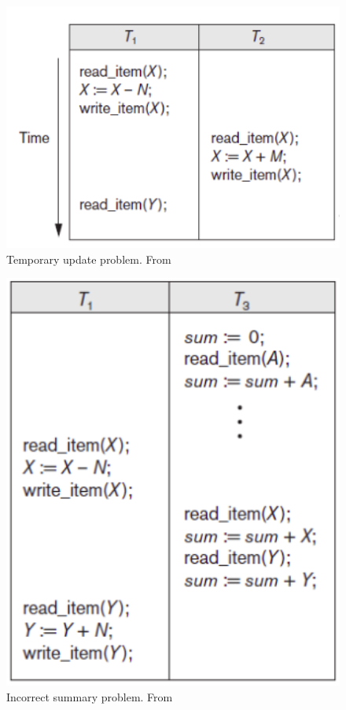 \newpage
\begin{appendices}
\begin{figure}[!h]
    \centering
    \includegraphics[width=12cm]{image/temporary_update_problem.png}
    \caption{Temporary update problem. From \cite{}}
    \label{fig:temporary_update_problem}
\end{figure}
\begin{figure}[!h]
    \centering
    \includegraphics[width=12cm]{image/incorrect_summary_problem.png}
    \caption{Incorrect summary problem. From \cite{}}
    \label{fig:incorrect_summary_problem}
\end{figure}
\end{appendices}
